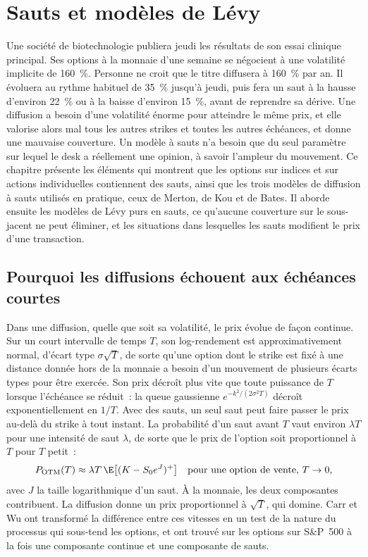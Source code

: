 \chapter{Sauts et modèles de Lévy}\label{ch:dv:jumps-and-levy-models}

Une société de biotechnologie publiera jeudi les résultats de son essai clinique principal. Ses options à la monnaie d'une semaine
se négocient à une volatilité implicite de 160~\%. Personne ne croit que le titre diffusera à
160~\% par an. Il évoluera au rythme habituel de 35~\% jusqu'à jeudi, puis fera un saut à la hausse d'environ 22~\% ou à la baisse d'environ 15~\%,
avant de reprendre sa dérive. Une diffusion a besoin d'une volatilité énorme pour atteindre le même prix, et elle valorise alors mal
tous les autres strikes et toutes les autres échéances, et donne une mauvaise couverture. Un modèle à sauts n'a besoin que du seul
paramètre sur lequel le desk a réellement une opinion, à savoir l'ampleur du mouvement. Ce chapitre présente les éléments
qui montrent que les options sur indices et sur actions individuelles contiennent des sauts, ainsi que les trois modèles de diffusion à sauts utilisés en pratique, ceux de Merton, de Kou et
de Bates. Il aborde ensuite les modèles de Lévy purs en sauts, ce qu'aucune couverture sur le sous-jacent ne peut éliminer, et les
situations dans lesquelles les sauts modifient le prix d'une transaction.

\section{Pourquoi les diffusions échouent aux échéances courtes}

Dans une diffusion, quelle que soit sa volatilité, le prix évolue de façon continue. Sur un court intervalle de temps $T$, son log-rendement est
approximativement normal, d'écart type $\sigma\sqrt T$, de sorte qu'une option dont le strike est fixé à une distance donnée hors de la monnaie
a besoin d'un mouvement de plusieurs écarts types pour être exercée. Son prix décroît plus vite que toute puissance de $T$ lorsque
l'échéance se réduit~: la queue gaussienne $e^{-k^2/(2\sigma^2T)}$ décroît exponentiellement en $1/T$. Avec des sauts, un seul saut peut faire passer le prix
au-delà du strike à tout instant. La probabilité d'un saut avant $T$ vaut environ
$\lambda T$ pour une intensité de saut $\lambda$, de sorte que le prix de l'option soit proportionnel à $T$ pour $T$ petit~:
\[
P_{\mathrm{OTM}}(T)\approx\lambda T\,\E\bigl[(K-S_0e^{J})^+\bigr]\quad\text{pour une option de vente, }T\to0,
\]
avec $J$ la taille logarithmique d'un saut. À la monnaie, les deux composantes contribuent. La diffusion donne un prix
proportionnel à $\sqrt T$, qui domine. Carr et Wu ont transformé la différence entre ces vitesses en un test
de la nature du processus qui sous-tend les options, et ont trouvé sur les options sur S\&P~500 à la fois une composante continue et une
composante de sauts.

